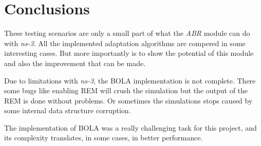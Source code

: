 \section{Conclusions}
\label{sec:simconclu}

These testing scenarios are only a small part of what the \textit{ABR} module can do with \textit{ns-3}.
All the implemented adaptation algorithms are compered in some interesting cases. But more importantly
is to show the potential of this module and also the improvement that can be made. 

Due to limitations with \textit{ns-3}, the BOLA implementation is not complete. There some 
bugs like enabling REM will crush the simulation but the output of the REM is done without
problems. Or sometimes the simulations stops caused by some internal data structure corruption.

The implementation of BOLA was a really challenging task for this project, and its complexity 
translates, in some cases, in better performance.